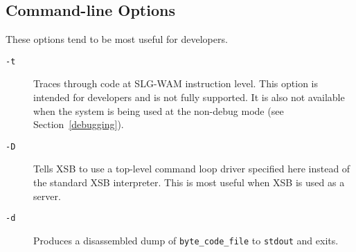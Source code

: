 \subsection{Command-line Options}  These options tend to be most useful for developers.

\begin{description}
\item[{\tt -t}] Traces through code at SLG-WAM instruction level.
  This option is intended for developers and is not fully supported.
  It is also not available when the system is being used at the
  non-debug mode (see Section~\ref{debugging}).
\item[{\tt -D}] Tells XSB to use a top-level command loop driver specified
  here instead of the standard XSB interpreter. This is most useful when
 XSB is used as a server.
\item[{\tt -d}] Produces a disassembled dump of {\tt byte\_code\_file} to 
    {\tt stdout} and exits.
\end{description}


